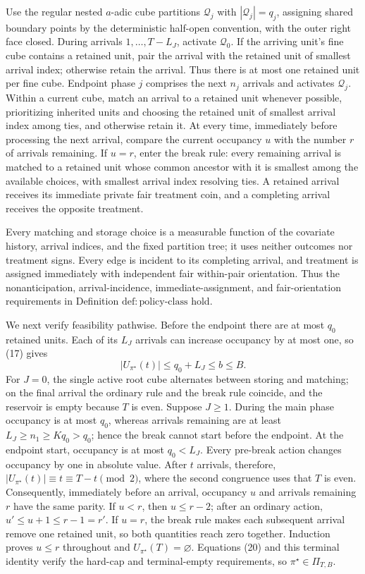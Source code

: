 Use the regular nested \(a\)-adic cube partitions \(\mathcal Q_j\) with \(|\mathcal Q_j|=q_j\), assigning shared boundary points by the deterministic half-open convention, with the outer right face closed.  During arrivals \(1,\ldots,T-L_J\), activate \(\mathcal Q_0\).  If the arriving unit's fine cube contains a retained unit, pair the arrival with the retained unit of smallest arrival index; otherwise retain the arrival.  Thus there is at most one retained unit per fine cube.  Endpoint phase \(j\) comprises the next \(n_j\) arrivals and activates \(\mathcal Q_j\).  Within a current cube, match an arrival to a retained unit whenever possible, prioritizing inherited units and choosing the retained unit of smallest arrival index among ties, and otherwise retain it.  At every time, immediately before processing the next arrival, compare the current occupancy \(u\) with the number \(r\) of arrivals remaining.  If \(u=r\), enter the break rule: every remaining arrival is matched to a retained unit whose common ancestor with it is smallest among the available choices, with smallest arrival index resolving ties.  A retained arrival receives its immediate private fair treatment coin, and a completing arrival receives the opposite treatment.

Every matching and storage choice is a measurable function of the covariate history, arrival indices, and the fixed partition tree; it uses neither outcomes nor treatment signs.  Every edge is incident to its completing arrival, and treatment is assigned immediately with independent fair within-pair orientation.  Thus the nonanticipation, arrival-incidence, immediate-assignment, and fair-orientation requirements in Definition \(\mathrm{def:policy\text{-}class}\) hold.

We next verify feasibility pathwise.  Before the endpoint there are at most \(q_0\) retained units.  Each of its \(L_J\) arrivals can increase occupancy by at most one, so (17) gives
\[
 |U_{\pi^\star}(t)|\le q_0+L_J\le b\le B. \tag{20}
\]
For \(J=0\), the single active root cube alternates between storing and matching; on the final arrival the ordinary rule and the break rule coincide, and the reservoir is empty because \(T\) is even.  Suppose \(J\ge1\).  During the main phase occupancy is at most \(q_0\), whereas arrivals remaining are at least \(L_J\ge n_1\ge Kq_0>q_0\); hence the break cannot start before the endpoint.  At the endpoint start, occupancy is at most \(q_0<L_J\).  Every pre-break action changes occupancy by one in absolute value.  After \(t\) arrivals, therefore, \(|U_{\pi^\star}(t)|\equiv t\equiv T-t\pmod 2\), where the second congruence uses that \(T\) is even.  Consequently, immediately before an arrival, occupancy \(u\) and arrivals remaining \(r\) have the same parity.  If \(u<r\), then \(u\le r-2\); after an ordinary action, \(u'\le u+1\le r-1=r'\).  If \(u=r\), the break rule makes each subsequent arrival remove one retained unit, so both quantities reach zero together.  Induction proves \(u\le r\) throughout and \(U_{\pi^\star}(T)=\varnothing\).  Equations (20) and this terminal identity verify the hard-cap and terminal-empty requirements, so \(\pi^\star\in\Pi_{T,B}\).

